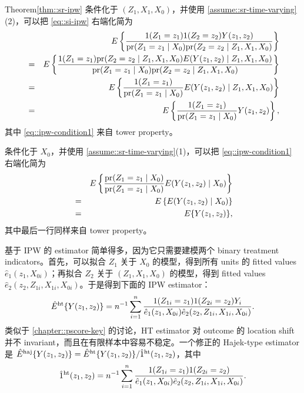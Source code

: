 \begin{myproof}{Theorem}{\cref{thm::sr-ipw}}
条件化于 $(Z_1, X_1, X_0)$，并使用 \cref{assume::sr-time-varying}(2)，可以把 \cref{eq::si-ipw} 右端化简为
\begin{eqnarray} 
&&E\left\{    \frac{  1(Z_1=z_1) 1(Z_2=z_2) Y(z_1,z_2)  }{    \textup{pr}(Z_1=z_1\mid X_0)  \textup{pr}(Z_2 = z_2 \mid Z_1, X_1, X_0)    }   \right\} \nonumber  \\
&=& E\left\{    \frac{  1(Z_1=z_1) \textup{pr}(Z_2=z_2\mid Z_1, X_1, X_0) E(Y(z_1,z_2) \mid Z_1, X_1, X_0)  }{    \textup{pr}(Z_1=z_1\mid X_0)  \textup{pr}(Z_2 = z_2 \mid Z_1, X_1, X_0)    }   \right\}  \nonumber    \\
&=& E\left\{    \frac{  1(Z_1=z_1)    }{    \textup{pr}(Z_1=z_1\mid X_0)     }  E(Y(z_1,z_2) \mid Z_1, X_1, X_0)  \right\}   \nonumber   \\
&=& E\left\{    \frac{  1(Z_1=z_1)    }{    \textup{pr}(Z_1=z_1\mid X_0)     }  Y(z_1,z_2)  \right\}, \label{eq::ipw-condition1}
\end{eqnarray}
其中 \cref{eq::ipw-condition1} 来自 tower property。


条件化于 $X_0$，并使用 \cref{assume::sr-time-varying}(1)，可以把 \cref{eq::ipw-condition1} 右端化简为
\begin{eqnarray*} 
&& E\left\{    \frac{  \textup{pr}(Z_1=z_1\mid X_0)    }{    \textup{pr}(Z_1=z_1\mid X_0)     }  E(Y(z_1,z_2) \mid X_0)  \right\}\\
&=& E\left\{    E(Y(z_1,z_2) \mid X_0)  \right\}\\
&=&  E\{Y(z_1,z_2)\},
\end{eqnarray*}
其中最后一行同样来自 tower property。
\end{myproof}


  
 
  
 
 基于 IPW 的 estimator 简单得多，因为它只需要建模两个 binary treatment indicators。首先，可以拟合 $Z_1$ 关于 $X_0$ 的模型，得到所有 units 的 fitted values $\hat{e}_{1}(z_1, X_{0i})$；再拟合 $Z_2$ 关于 $(Z_1, X_1, X_0)$ 的模型，得到 fitted values $\hat{e}_{2}(z_2, Z_{1i}, X_{1i}, X_{0i})$。于是得到下面的 IPW estimator：
$$
\hat{E}^\textup{ht}\{ Y(z_1, z_2) \}  = n^{-1} \sum_{i=1}^n 
  \frac{  1(Z_{1i}=z_1) 1(Z_{2i}=z_2) Y_i  }{   \hat{e}_{1}(z_1, X_{0i}) \hat{e}_{2} (z_2, Z_{1i}, X_{1i}, X_{0i})   }  .
$$
类似于 \cref{chapter::pscore-key} 的讨论，HT estimator 对 outcome 的 location shift 并不 invariant，而且在有限样本中容易不稳定。一个修正的 Hajek-type estimator 是 $\hat{E}^\textup{haj}\{ Y(z_1, z_2) \}  = \hat{E}^\textup{ht}\{ Y(z_1, z_2) \}   / \hat 1^\textup{ht}(z_1,z_2)$，其中
$$
\hat 1^\textup{ht}(z_1,z_2)  = n^{-1}  \sum_{i=1}^n 
  \frac{  1(Z_{1i}=z_1) 1(Z_{2i}=z_2)  }{   \hat{e}_{1} (z_1, X_{0i})\hat{e}_{2} (z_2, Z_{1i}, X_{1i}, X_{0i})   }  .
$$


